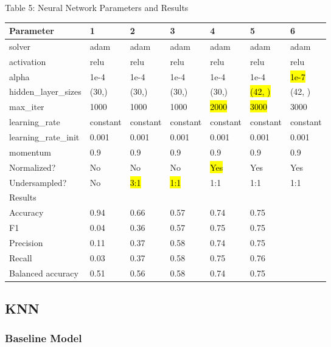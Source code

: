 \documentclass{article}
\begin{document}
\begin{table}

	\centering
	Table 5: Neural Network Parameters and Results\\
	\begin{tabular}{ l l l l l l l }
		\hline
		Parameter & 1 & 2 & 3 & 4 & 5 & 6\\
		\hline
		solver & adam & adam & adam & adam & adam & adam \\
		activation & relu & relu & relu & relu & relu & relu \\
		alpha & 1e-4 & 1e-4 & 1e-4 & 1e-4 & 1e-4 & \hl{1e-7} \\
		hidden\_layer\_sizes & (30,) & (30,) & (30,) & (30,) & \hl{(42, )} & (42, )\\
		max\_iter & 1000 & 1000 & 1000 & \hl{2000} & \hl{3000} & 3000 \\
		learning\_rate & constant & constant & constant & constant & constant& constant \\
		learning\_rate\_init & 0.001 & 0.001 & 0.001 & 0.001 & 0.001 & 0.001 \\
		momentum & 0.9 & 0.9 & 0.9 & 0.9 & 0.9 & 0.9 \\
		Normalized? & No & No & No & \hl{Yes} & Yes & Yes\\
		Undersampled? & No & \hl{3:1} & \hl{1:1} & 1:1 & 1:1 & 1:1 \\
		\hline
		Results & & & & & \\
		\hline
		Accuracy & 0.94 & 0.66 & 0.57 & 0.74 & 0.75 \\
		F1 & 0.04 & 0.36 & 0.57 & 0.75 & 0.75 \\
		Precision & 0.11 & 0.37 & 0.58 & 0.74 & 0.75\\
		Recall & 0.03 & 0.37 & 0.58 & 0.75 & 0.76\\
		Balanced accuracy & 0.51 & 0.56 & 0.58 & 0.74 & 0.75\\
	
		\hline 
	\end{tabular}
\end{table}

\subsection{KNN}
\subsubsection*{Baseline Model}
\end{document}
